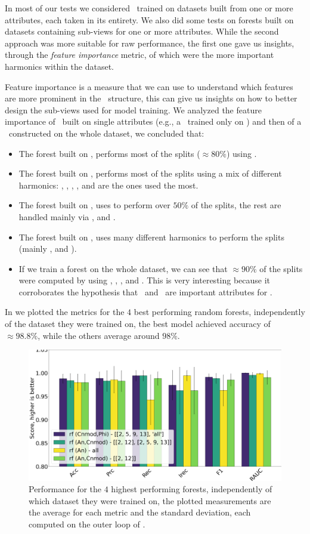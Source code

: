 In most of our tests we considered \rfs\ trained on datasets built from one or more attributes, each
taken in its entirety. We also did some tests on forests built on datasets containing sub-views for
one or more attributes. While the second approach was more suitable for raw performance, the first
one gave us insights, through the \emph{feature importance} metric, of which were the more important
harmonics within the dataset.

Feature importance is a measure that we can use to understand which features are more prominent in
the \rf\ structure, this can give us insights on how to better design the sub-views used for model
training. We analyzed the feature importance of \rfs\ built on single attributes (e.g., a \rf\
trained only on \an) and then of a \rf\ constructed on the whole dataset, we concluded that:
\begin{itemize}
	\item The forest built on \an, performs most of the splits ($\approx 80\%$) using \an[2].
	\item The forest built on \bn, performs most of the splits using a mix of different
	      harmonics: \bn[6], \bn[9], \bn[3], \bn[14], \bn[7] and \bn[5] are the ones used the most.
	\item The forest built on \cnmod, uses \cnmod[2] to perform over $50\%$ of the splits, the
	      rest are handled mainly via \cnmod[5], \cnmod[9] and \cnmod[13].
	\item The forest built on \phin, uses many different harmonics to perform the splits (mainly
	      \phin[10], \phin[12] and \phin[6]).
	\item If we train a forest on the whole dataset, we can see that $\approx90\%$ of the splits
	      were computed by using \cnmod[2], \cnmod[3], \an[12], \an[2] and \an[14]. This is very
	      interesting because it corroborates the hypothesis that \cnmod\ and \an\ are
	      important attributes for \qrp.
\end{itemize}

In  we plotted the metrics for the $4$ best performing random forests,
independently of the dataset they were trained on, the best model achieved accuracy of
$\approx 98.8\%$, while the others average around $98\%$.
\begin{figure}[!ht]
	\centering
	\includegraphics[width=0.7\linewidth]{img/best_rfs.png}
	\caption{Performance for the $4$ highest performing forests, independently of which
		dataset they were trained on, the plotted measurements are the average for each metric and
		the standard deviation, each computed on the outer loop of \ncv.} \label{fig:best-rfs}
\end{figure}

